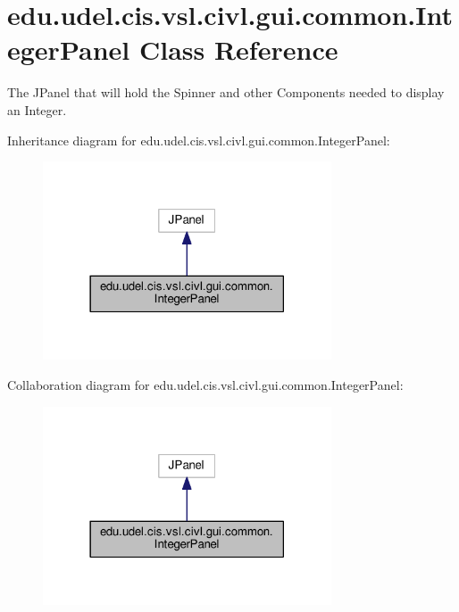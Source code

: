 \hypertarget{classedu_1_1udel_1_1cis_1_1vsl_1_1civl_1_1gui_1_1common_1_1IntegerPanel}{}\section{edu.\+udel.\+cis.\+vsl.\+civl.\+gui.\+common.\+Integer\+Panel Class Reference}
\label{classedu_1_1udel_1_1cis_1_1vsl_1_1civl_1_1gui_1_1common_1_1IntegerPanel}


The J\+Panel that will hold the Spinner and other Components needed to display an Integer.  




Inheritance diagram for edu.\+udel.\+cis.\+vsl.\+civl.\+gui.\+common.\+Integer\+Panel\+:
\nopagebreak
\begin{figure}[H]
\begin{center}
\leavevmode
\includegraphics[width=242pt]{classedu_1_1udel_1_1cis_1_1vsl_1_1civl_1_1gui_1_1common_1_1IntegerPanel__inherit__graph}
\end{center}
\end{figure}


Collaboration diagram for edu.\+udel.\+cis.\+vsl.\+civl.\+gui.\+common.\+Integer\+Panel\+:
\nopagebreak
\begin{figure}[H]
\begin{center}
\leavevmode
\includegraphics[width=242pt]{classedu_1_1udel_1_1cis_1_1vsl_1_1civl_1_1gui_1_1common_1_1IntegerPanel__coll__graph}
\end{center}
\end{figure}
